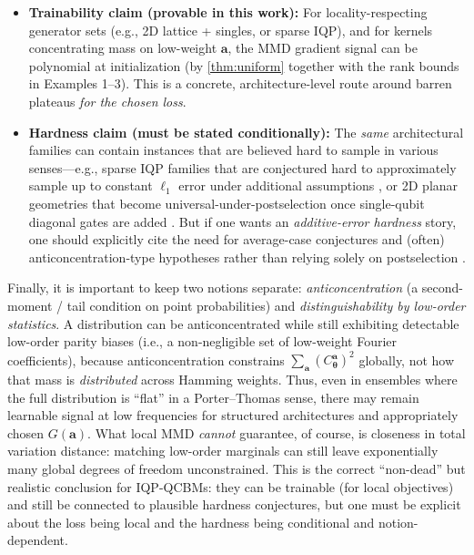 \documentclass[a4paper,onecolumn,notitlepage,nofootinbib,longbibliography,superscriptaddress, floatfix, pra, aps, 10pt]{revtex4-2}
\newcommand{\vttheta}{{\bm{\theta}}}
\newcommand{\vta}{{\bm{a}}}
\begin{document}
\begin{itemize}
\item \textbf{Trainability claim (provable in this work):} For locality-respecting generator sets (e.g., 2D lattice + singles, or sparse IQP), and for kernels concentrating mass on low-weight $\vta$, the MMD gradient signal can be polynomial at initialization (by \cref{thm:uniform} together with the rank bounds in Examples 1--3). This is a concrete, architecture-level route around barren plateaus \emph{for the chosen loss}.

\item \textbf{Hardness claim (must be stated conditionally):} The \emph{same} architectural families can contain instances that are believed hard to sample in various senses---e.g., sparse IQP families that are conjectured hard to approximately sample up to constant $\ell_1$ error under additional assumptions \cite[Thm.~3 (informal) and surrounding discussion]{bms17sparse}, or 2D planar geometries that become universal-under-postselection once single-qubit diagonal gates are added \cite[discussion after item (ii)]{fujiiMorimae16}. But if one wants an \emph{additive-error hardness} story, one should explicitly cite the need for average-case conjectures and (often) anticoncentration-type hypotheses rather than relying solely on postselection \cite{bms16approx}.
\end{itemize}

Finally, it is important to keep two notions separate: \emph{anticoncentration} (a second-moment / tail condition on point probabilities) and \emph{distinguishability by low-order statistics}. A distribution can be anticoncentrated while still exhibiting detectable low-order parity biases (i.e., a non-negligible set of low-weight Fourier coefficients), because anticoncentration constrains $\sum_\vta (C_\vttheta^\vta)^2$ globally, not how that mass is \emph{distributed} across Hamming weights. Thus, even in ensembles where the full distribution is ``flat'' in a Porter--Thomas sense, there may remain learnable signal at low frequencies for structured architectures and appropriately chosen $G(\vta)$. What local MMD \emph{cannot} guarantee, of course, is closeness in total variation distance: matching low-order marginals can still leave exponentially many global degrees of freedom unconstrained. This is the correct ``non-dead'' but realistic conclusion for IQP-QCBMs: they can be trainable (for local objectives) and still be connected to plausible hardness conjectures, but one must be explicit about the loss being local and the hardness being conditional and notion-dependent.
\end{document}
